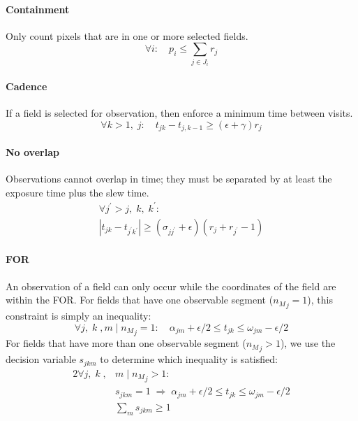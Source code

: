 \documentclass[twocolumn,times]{aastex631}
\begin{document}
\paragraph{Containment}
Only count pixels that are in one or more selected fields.
%
\begin{equation}
    \label{eq:fixed-exptime-constraint-containment}
    \forall i :\quad p_i \leq \sum_{j \in J_i} r_j
\end{equation}

\paragraph{Cadence}
If a field is selected for observation, then enforce a minimum time between visits.
%
\begin{equation}
    \label{eq:fixed-exptime-constraint-cadence}
    \forall k > 1 ,\; j :\quad t_{jk} - t_{j,k-1} \geq (\epsilon + \gamma) r_j
\end{equation}

\paragraph{No overlap}
Observations cannot overlap in time; they must be separated by at least the exposure time plus the slew time.
%
\begin{multline}
    \label{eq:fixed-exptime-constraint-no-overlap}
    \forall j^\prime > j,\; k ,\; k^\prime : \\ \left|t_{jk} - t_{j^\prime k^\prime}\right|  \geq \left(\sigma_{jj^\prime} + \epsilon\right) \left( r_j + r_{j^\prime} - 1\right)
\end{multline}

\paragraph{\ac{FOR}}
An observation of a field can only occur while the coordinates of the field are within the \ac{FOR}. For fields that have one observable segment (${n_M}_j = 1$), this constraint is simply an inequality:
%
\begin{equation}
    \label{eq:fixed-exptime-constraint-for-one}
    \forall j ,\; k \;, m \mid {n_M}_j = 1 :\quad \alpha_{jm} + \epsilon / 2 \leq t_{jk} \leq \omega_{jm} - \epsilon / 2
\end{equation}
%
For fields that have more than one observable segment (${n_M}_j > 1$), we use the decision variable $s_{jkm}$ to determine which inequality is satisfied:
%
\begin{alignat}{2}
    \label{eq:fixed-exptime-constraint-for-many}
    \forall j ,\; k \;, &m \mid {n_M}_j > 1 : \nonumber \\
    &s_{jkm} = 1 \;\Rightarrow\; \alpha_{jm} + \epsilon / 2 \leq t_{jk} \leq \omega_{jm} - \epsilon / 2 \\
    &\sum_m s_{jkm} \geq 1
\end{alignat}
\end{document}
